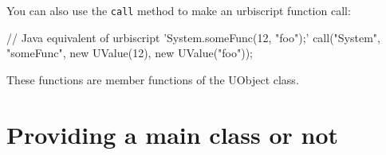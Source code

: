 You can also use the \lstinline{call} method to make an urbiscript function
call:

\begin{urbiunchecked}
// Java equivalent of urbiscript 'System.someFunc(12, "foo");'
call("System", "someFunc", new UValue(12), new UValue("foo"));
\end{urbiunchecked}

These functions are member functions of the UObject class.


%
%
%
%
%
%
%
%
%
%
%


\section{Providing a main class or not}


